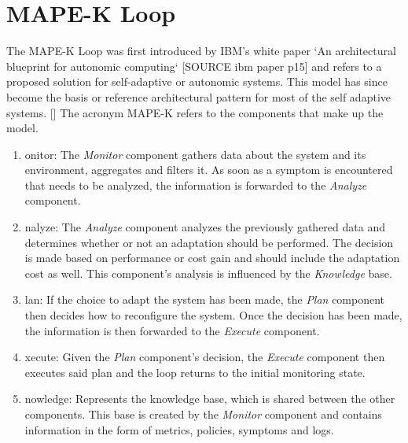     \section{MAPE-K Loop}
    The MAPE-K Loop was first introduced by IBM's white paper `An architectural blueprint for autonomic computing` [SOURCE ibm paper p15]
    and refers to a proposed solution for self-adaptive or autonomic systems.
    This model has since become the basis or reference architectural pattern for most of the self adaptive systems. []
    The acronym MAPE-K refers to the components that make up the model.
    \begin{enumerate}
        \item {}onitor: 
            The \textit{Monitor} component gathers data about the system and its environment, aggregates and filters it.
            As soon as a symptom is encountered that needs to be analyzed, the information is forwarded to the \textit{Analyze} component.
        \item {}nalyze: 
            The \textit{Analyze} component analyzes the previously gathered data and determines whether or not an adaptation should be performed.
            The decision is made based on performance or cost gain and should include the adaptation cost as well.
            This component's analysis is influenced by the \textit{Knowledge} base.
        \item {}lan: 
            If the choice to adapt the system has been made, the \textit{Plan} component then decides how to reconfigure the system.
            Once the decision has been made, the information is then forwarded to the \textit{Execute} component.
        \item {}xecute: 
            Given the \textit{Plan} component's decision, the \textit{Execute} component then executes said plan and the loop returns to the initial monitoring state.
        \item {}nowledge: 
            Represents the knowledge base, which is shared between the other components.
            This base is created by the \textit{Monitor} component and contains information in the form of metrics, policies, symptoms and logs.
    \end{enumerate}
    



